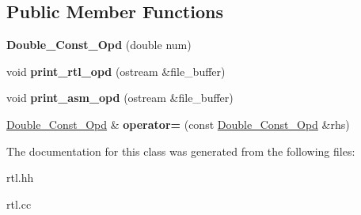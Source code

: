 \subsection*{Public Member Functions}
\begin{DoxyCompactItemize}
\item 
\mbox{\label{classDouble__Const__Opd_ac6a82b536a5edaafe13f40aa309ebdb6}} 
{\bfseries Double\+\_\+\+Const\+\_\+\+Opd} (double num)
\item 
\mbox{\label{classDouble__Const__Opd_af93443dc08f847d705498555b845ade7}} 
void {\bfseries print\+\_\+rtl\+\_\+opd} (ostream \&file\+\_\+buffer)
\item 
\mbox{\label{classDouble__Const__Opd_a69e5fdba7f9defca668fa0f3b59af362}} 
void {\bfseries print\+\_\+asm\+\_\+opd} (ostream \&file\+\_\+buffer)
\item 
\mbox{\label{classDouble__Const__Opd_aeb22da09f91d4cad9243f792029f6e60}} 
\hyperlink{classDouble__Const__Opd}{Double\+\_\+\+Const\+\_\+\+Opd} \& {\bfseries operator=} (const \hyperlink{classDouble__Const__Opd}{Double\+\_\+\+Const\+\_\+\+Opd} \&rhs)
\end{DoxyCompactItemize}


The documentation for this class was generated from the following files\+:\begin{DoxyCompactItemize}
\item 
rtl.\+hh\item 
rtl.\+cc\end{DoxyCompactItemize}
